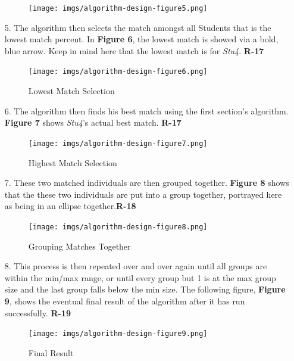 \documentclass[12pt,letterpaper]{article}
\begin{document}
\begin{enumerate}
\begin{figure}[H]
	\begin{center}
		\texttt{[image: imgs/algorithm-design-figure5.png]}
	\end{center}
\end{figure}
\newpage{}
	\item[5.] The algorithm then selects the match amongst all Students that is the lowest match percent. In {\bf Figure 6}, the lowest match is showed via a bold, blue arrow. Keep in mind here that the lowest match is for {\it Stu4}. {\bf R-17}
\begin{figure}[H]
	\caption{Lowest Match Selection}
	\begin{center}
		\texttt{[image: imgs/algorithm-design-figure6.png]}
	\end{center}
\end{figure}
	\item[6.] The algorithm then finds his best match using the first section's algorithm. {\bf Figure 7} shows {\it Stu4}'s actual best match. {\bf R-17}
\begin{figure}[H]
	\caption{Highest Match Selection}
	\begin{center}
		\texttt{[image: imgs/algorithm-design-figure7.png]}
	\end{center}
\end{figure}
	\item[7.] These two matched individuals are then grouped together. {\bf Figure 8} shows that the these two individuals are put into a group together, portrayed here as being in an ellipse together.{\bf R-18}
\begin{figure}[H]
	\caption{Grouping Matches Together}
	\begin{center}
		\texttt{[image: imgs/algorithm-design-figure8.png]}
	\end{center}
\end{figure}
\newpage{}
	\item[8.] This process is then repeated over and over again until all groups are within the min/max range, or until every group but 1 is at the max group size and the last group falls below the min size. The following figure, {\bf Figure 9}, shows the eventual final result of the algorithm after it has run successfully. {\bf R-19}
\begin{figure}[H]
	\caption{Final Result}
	\begin{center}
		\texttt{[image: imgs/algorithm-design-figure9.png]}
	\end{center}
\end{figure}

\end{enumerate}
\end{document}

